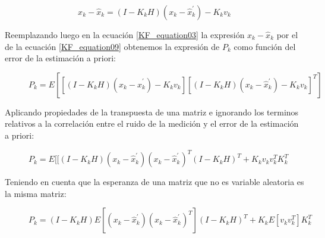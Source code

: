\documentclass[10pt,a4paper]{article}
\begin{document}
	\begin{figure}[h!]
		\begin{center}
			\begin{equation}
				x_k - \hat{x}_k = (I-K_k H)(x_k - \hat{x}^\prime_k) - K_kv_{k}
				\label{KF_equation09}
			\end{equation}	
		\end{center}
	\end{figure}
	
	
	Reemplazando luego en la ecuación \ref{KF_equation03} la expresión $x_k - \hat{x}_k$  por el de la ecuación \ref{KF_equation09} obtenemos la expresión de $P_k$ como función del error de la estimación a priori:
	
	\begin{figure}[h!]
		\begin{center}
			\begin{equation}
				P_k = E[[(I-K_k H)(x_k - \hat{x}^\prime_k) - K_kv_{k}][ (I-K_k H)(x_k - \hat{x}^\prime_k) - K_kv_{k}]^T]
				\label{KF_equation10}
			\end{equation}	
		\end{center}
	\end{figure}
	
	Aplicando propiedades de la transpuesta de una matriz e ignorando los terminos relativos a la correlación entre el ruido de la medición y el error de la estimación a priori:
	
	\begin{figure}[h!]
		\begin{center}
			\begin{equation}
				P_k = E[[(I-K_k H)(x_k - \hat{x}^\prime_k)(x_k - \hat{x}^\prime_k)^T(I-K_k H)^T + K_k v_{k} v_{k}^T K_k^T 
				\label{KF_equation11}
			\end{equation}	
		\end{center}
	\end{figure}
	
	
	Teniendo en cuenta que la esperanza de una matriz que no es variable aleatoria es la misma matriz:
	
	\begin{figure}[h!]
		\begin{center}
			\begin{equation}
				P_k = (I-K_k H) E[(x_k - \hat{x}^\prime_k)(x_k - \hat{x}^\prime_k)^T](I-K_k H)^T + K_k E[v_{k} v_{k}^T] K_k^T 
				\label{KF_equation12}
			\end{equation}	
		\end{center}
	\end{figure}
	
\end{document}
